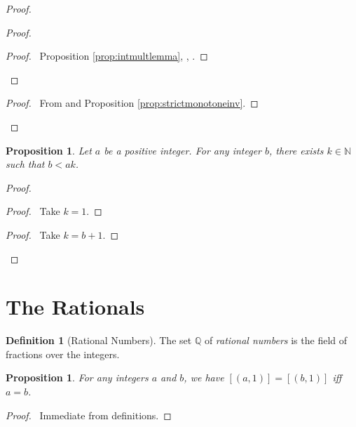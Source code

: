 \documentclass{book}
\let\qed\relax
\newtheorem{prop}[ax]{Proposition}
\theoremstyle{definition}
\newtheorem{df}[ax]{Definition}
\begin{document}
\begin{proof}
\pf
{}
\begin{proof}
	\begin{proof}
		\pf\ Proposition \ref{prop:intmultlemma}, , .
	\end{proof}
\end{proof}
\begin{proof}
	\pf\ From  and Proposition \ref{prop:strictmonotoneinv}.
\end{proof}
\qed
\end{proof}

\begin{prop}
\label{prop:Zarchimedean}
Let $a$ be a positive integer. For any integer $b$, there exists $k \in \mathbb{N}$ such that $b < ak$.
\end{prop}

\begin{proof}
\pf
{}
\begin{proof}
	\pf\ Take $k = 1$.
\end{proof}
\begin{proof}
	\pf\ Take $k = b + 1$.
\end{proof}
\qed
\end{proof}

\section{The Rationals}

\begin{df}[Rational Numbers]
The set $\mathbb{Q}$ of \emph{rational numbers} is the field of fractions over the integers.
\end{df}

\begin{prop}
For any integers $a$ and $b$, we have $[(a,1)] = [(b,1)]$ iff $a = b$.
\end{prop}

\begin{proof}
\pf\ Immediate from definitions. \qed
\end{proof}
\end{document}
